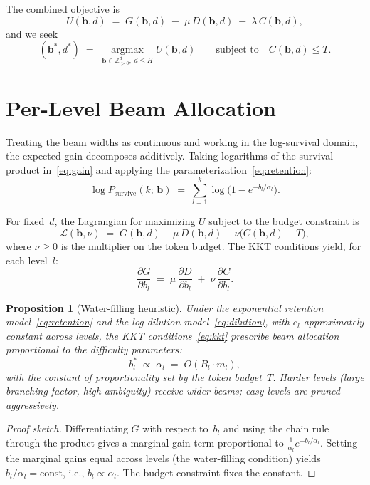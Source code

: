\documentclass[11pt]{article}
\newcommand{\bvec}{\mathbf{b}}
\theoremstyle{plain}
\newtheorem{proposition}{Proposition}
\begin{document}
The combined objective is
\begin{equation}\label{eq:objective}
  U(\bvec, d)
  \;=\; G(\bvec, d)
  \;-\; \mu\, D(\bvec, d)
  \;-\; \lambda\, C(\bvec, d),
\end{equation}
and we seek
\[
  (\bvec^*, d^*)
  \;=\; \operatorname*{argmax}_{\bvec \in \mathbb{Z}_{>0}^d,\; d \leq H}
    U(\bvec, d)
  \qquad \text{subject to} \quad
  C(\bvec, d) \leq T.
\]

\section{Per-Level Beam Allocation}\label{sec:allocation}

Treating the beam widths as continuous and working in the log-survival
domain, the expected gain decomposes additively.  Taking logarithms of
the survival product in~\eqref{eq:gain} and applying the
parameterization~\eqref{eq:retention}:
\[
  \log P_{\mathrm{survive}}(k;\,\bvec)
  \;=\; \sum_{l=1}^{k}
    \log\!\bigl(1 - e^{-b_l/\alpha_l}\bigr).
\]

For fixed~$d$, the Lagrangian for maximizing $U$ subject to the budget
constraint is
\[
  \mathcal{L}(\bvec, \nu)
  \;=\; G(\bvec, d) - \mu\,D(\bvec,d)
        - \nu\bigl(C(\bvec,d) - T\bigr),
\]
where $\nu \geq 0$ is the multiplier on the token budget.  The KKT
conditions yield, for each level~$l$:
\begin{equation}\label{eq:kkt}
  \frac{\partial G}{\partial b_l}
  \;=\; \mu \,\frac{\partial D}{\partial b_l}
  \;+\; \nu \,\frac{\partial C}{\partial b_l}.
\end{equation}

\begin{proposition}[Water-filling heuristic]\label{prop:waterfill}
Under the exponential retention model~\eqref{eq:retention} and the
log-dilution model~\eqref{eq:dilution}, with $c_l$ approximately
constant across levels, the KKT conditions~\eqref{eq:kkt} prescribe
beam allocation proportional to the difficulty parameters:
\[
  b_l^* \;\propto\; \alpha_l
  \;=\; O(B_l \cdot m_l),
\]
with the constant of proportionality set by the token budget~$T$.
Harder levels (large branching factor, high ambiguity) receive wider
beams; easy levels are pruned aggressively.
\end{proposition}

\begin{proof}[Proof sketch]
Differentiating $G$ with respect to~$b_l$ and using the chain rule
through the product gives a marginal-gain term proportional to
$\frac{1}{\alpha_l} e^{-b_l/\alpha_l}$.  Setting the marginal gains
equal across levels (the water-filling condition) yields
$b_l / \alpha_l = \text{const}$, i.e., $b_l \propto \alpha_l$.
The budget constraint fixes the constant.
\end{proof}
\end{document}
